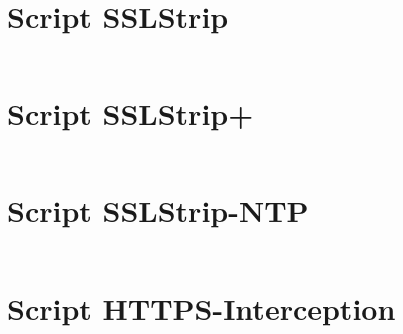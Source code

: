 \begin{appendices}

  \chapter{Script SSLStrip}
  \label{appendix:sslstrip}
  \inputminted{python}{../sslstrip/immortal/sslstrip.py}

  \chapter{Script SSLStrip+}
  \label{appendix:sslstrip2}
  \inputminted{python}{../sslstrip2/immortal/sslstrip2.py}

  \chapter{Script SSLStrip-NTP}
  \label{appendix:sslstrip-ntp}
  \inputminted{python}{../sslstrip-ntp/immortal/sslstrip-ntp.py}

  \chapter{Script HTTPS-Interception}
  \label{appendix:https-interception}
  \inputminted{python}{../https-interception/immortal/https-interception.py}

\end{appendices}
